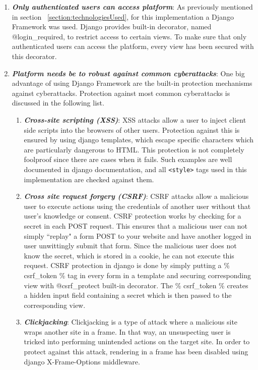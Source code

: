 \begin{enumerate}
	\setlength{\itemsep}{1pt}
	\item \textbf{\textit{Only authenticated users can access platform}}: As previously mentioned in section ~\ref{section:technologiesUsed}, for this implementation a Django Framework was used. Django provides built-in decorator, named @login\_required, to restrict access to certain views. To make sure that only authenticated users can access the platform, every view has been secured with this decorator. 

	\item \textbf{\textit{Platform needs be to robust against common cyberattacks}}: One big advantage of using Django Framework are the built-in protection mechanisms against cyberattacks. Protection against most common cyberattacks is discussed in the following list.

		\begin{enumerate}
		\setlength{\itemsep}{1pt}
		\item \textbf{\textit{Cross-site scripting (XSS)}}: XSS attacks allow a user to inject client side scripts into the browsers of other users. Protection against this is ensured by using django templates, which escape specific characters which are particularly dangerous to HTML. This protection is not completely foolproof since there are cases when it fails. Such examples are well documented in django documentation, and all \verb|<style>| tags used in this implementation are checked against them.

		\item \textbf{\textit{Cross site request forgery (CSRF)}}: CSRF attacks allow a malicious user to execute actions using the credentials of another user without that user's knowledge or consent. CSRF protection works by checking for a secret in each POST request. This ensures that a malicious user can not simply ``replay" a form POST to your website and have another logged in user unwittingly submit that form. Since the malicious user does not know the secret, which is stored in a cookie, he can not execute this request. CSRF protection in django is done by simply putting a {\% csrf\_token \%} tag in every form in a template and securing corresponding view with @csrf\_protect built-in decorator. The {\% csrf\_token \%} creates a hidden input field containing a secret which is then passed to the corresponding view.

		\item \textbf{\textit{Clickjacking}}: Clickjacking is a type of attack where a malicious site wraps another site in a frame. In that way, an unsuspecting user is tricked into performing unintended actions on the target site. In order to protect against this attack, rendering in a frame has been disabled using django X-Frame-Options middleware.


\end{enumerate}
\end{enumerate}
